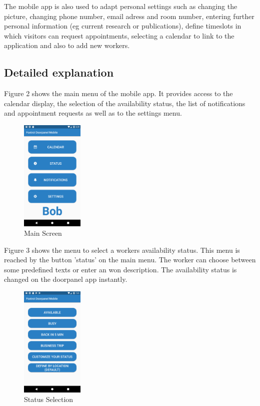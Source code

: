 \documentclass[article,colorback,accentcolor=tud4c, 11pt]{tudreport}
\begin{document}
The mobile app is also used to adapt personal settings such as changing the picture, changing phone number, email adress and room number, entering further personal information (eg current research or publications), define timeslots in which visitors can request appointments, selecting a calendar to link to the application and also to add new workers.
	
\subsection{Detailed explanation}

Figure 2 shows the main menu of the mobile app. It provides access to the calendar display, the selection of the availability status, the list of notifications and appointment requests as well as to the settings menu.\\

	\begin{figure}
	 \centering
	   \includegraphics[width=30mm,scale=0.8]{mobile/Main-Screen.png}
	   \caption{Main Screen}
	\end{figure}

Figure 3 shows the menu to select a workers availability status. This menu is reached by the button 'status' on the main menu. The worker can choose between some predefined texts or enter an won description. The availability status is changed on the doorpanel app instantly.\\
 
	\begin{figure}
		\centering
		\includegraphics[width=30mm,scale=0.8]{mobile/Status-selection.png}
		\caption{Status Selection}
	\end{figure}
	
\end{document}
